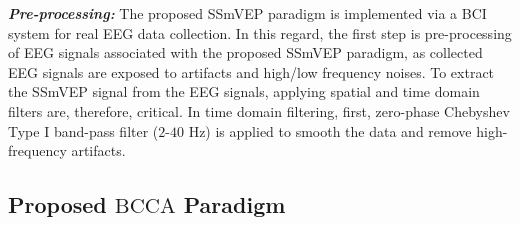 \documentclass[sensors,accept,moreauthors,pdftex,10pt,a4paper]{mdpi}
\def\DCCA{\text{BCCA}}
\theoremstyle{mdpi}
\newcounter{ex}
\newcounter{re}
\theoremstyle{mdpidefinition}
\begin{document}
\vspace{0.1in}
\noindent
\textbf{\textit{Pre-processing:}}
The proposed SSmVEP paradigm is implemented via a BCI system for real EEG data collection. In this regard, the first step is pre-processing of EEG signals associated with the proposed SSmVEP paradigm, as collected EEG signals are exposed to artifacts and high/low frequency noises. To extract the SSmVEP signal from the EEG signals, applying spatial and time domain filters are, therefore, critical. In time domain filtering, first, zero-phase Chebyshev Type I band-pass filter ($2$-$40$ Hz) is applied to smooth the data and remove high-frequency artifacts.

\subsection{Proposed $\DCCA$ Paradigm}
\end{document}
